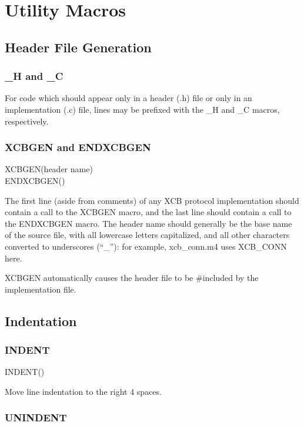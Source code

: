 \documentclass[english]{article}
\begin{document}
\section{Utility Macros}


\subsection{Header File Generation}


\subsubsection{\_H and \_C}

For code which should appear only in a header (.h) file or only in
an implementation (.c) file, lines may be prefixed with the \_H and
\_C macros, respectively.


\subsubsection{XCBGEN and ENDXCBGEN}

XCBGEN(header name)\\
ENDXCBGEN()

The first line (aside from comments) of any XCB protocol implementation
should contain a call to the XCBGEN macro, and the last line should
contain a call to the ENDXCBGEN macro. The header name should generally
be the base name of the source file, with all lowercase letters capitalized,
and all other characters converted to underscores ({}``\_''): for
example, xcb\_conn.m4 uses XCB\_CONN here.

XCBGEN automatically causes the header file to be \#included by the
implementation file.


\subsection{Indentation}


\subsubsection{INDENT}

INDENT()

Move line indentation to the right 4 spaces.


\subsubsection{UNINDENT}
\end{document}
